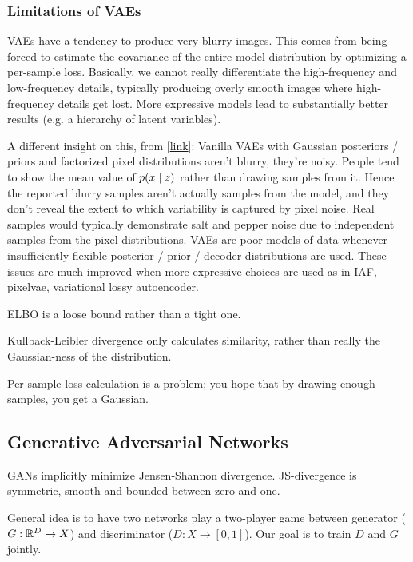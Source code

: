 \documentclass[12pt]{article}
\begin{document}
\subsubsection{Limitations of VAEs}
\par VAEs have a tendency to produce very blurry images. This comes from being forced to estimate the covariance of the entire model distribution by optimizing a per-sample loss. Basically, we cannot really differentiate the high-frequency and low-frequency details, typically producing overly smooth images where high-frequency details get lost. More expressive models lead to substantially better results (e.g. a hierarchy of latent variables).
\par A different insight on this, from [\href{https://www.reddit.com/r/MachineLearning/comments/9t712f/dwhy_are_images_created_by_gan_sharper_than/}{link}]: Vanilla VAEs with Gaussian posteriors / priors and factorized pixel distributions aren't blurry, they're noisy. People tend to show the mean value of $p(x\mid z)$ rather than drawing samples from it. Hence the reported blurry samples aren't actually samples from the model, and they don't reveal the extent to which variability is captured by pixel noise. Real samples would typically demonstrate salt and pepper noise due to independent samples from the pixel distributions. VAEs are poor models of data whenever insufficiently flexible posterior / prior / decoder distributions are used. These issues are much improved when more expressive choices are used as in IAF, pixelvae, variational lossy autoencoder.
\par ELBO is a loose bound rather than a tight one.
\par Kullback-Leibler divergence only calculates similarity, rather than really the Gaussian-ness of the distribution.
\par Per-sample loss calculation is a problem; you hope that by drawing enough samples, you get a Gaussian.

\subsection{Generative Adversarial Networks}
GANs implicitly minimize Jensen-Shannon divergence. JS-divergence is symmetric, smooth and bounded between zero and one.
\par General idea is to have two networks play a two-player game between generator ($G: \mathbb{R}^{D} \to X$) and discriminator ($D: X \to [0,1]$). Our goal is to train $D$ and $G$ jointly.
\end{document}

